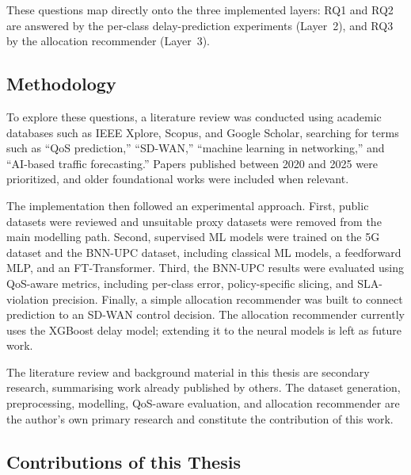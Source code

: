 \documentclass[a4paper,12pt]{Classes/RoboticsLaTeX}
\begin{document}
    These questions map directly onto the three implemented layers: RQ1 and RQ2 are answered by the per-class delay-prediction experiments (Layer~2), and RQ3 by the allocation recommender (Layer~3).

    \subsection*{Methodology}
    
    To explore these questions, a literature review was conducted using academic databases such as IEEE Xplore, Scopus, and Google Scholar, searching for terms such as ``QoS prediction,'' ``SD-WAN,'' ``machine learning in networking,'' and ``AI-based traffic forecasting.'' Papers published between 2020 and 2025 were prioritized, and older foundational works were included when relevant.

    The implementation then followed an experimental approach. First, public datasets were reviewed and unsuitable proxy datasets were removed from the main modelling path. Second, supervised ML models were trained on the 5G dataset and the BNN-UPC dataset, including classical ML models, a feedforward MLP, and an FT-Transformer. Third, the BNN-UPC results were evaluated using QoS-aware metrics, including per-class error, policy-specific slicing, and SLA-violation precision. Finally, a simple allocation recommender was built to connect prediction to an SD-WAN control decision. The allocation recommender currently uses the XGBoost delay model; extending it to the neural models is left as future work.

    The literature review and background material in this thesis are secondary research, summarising work already published by others. The dataset generation, preprocessing, modelling, QoS-aware evaluation, and allocation recommender are the author's own primary research and constitute the contribution of this work.

    \subsection*{Contributions of this Thesis}
    \label{sec:contributions}
\end{document}
